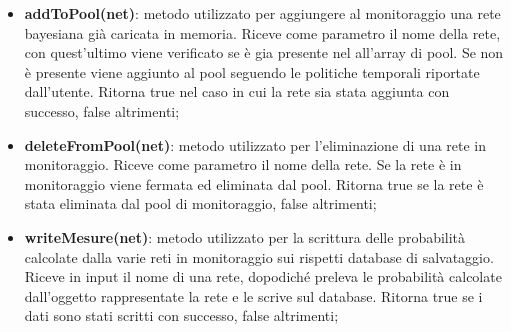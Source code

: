 \begin{itemize}
	\item \textbf{addToPool(net)}: metodo utilizzato per aggiungere al monitoraggio una rete bayesiana già 
	caricata in memoria. Riceve come parametro il nome della rete, con quest'ultimo viene verificato 
	se è gia presente nel all'array di pool. Se non è presente viene aggiunto al pool seguendo le politiche 
	temporali riportate dall'utente. Ritorna true nel caso in cui la rete sia stata aggiunta con successo, false 
	altrimenti; 

	\item \textbf{deleteFromPool(net)}: metodo utilizzato per l'eliminazione di una rete in monitoraggio. Riceve
	come parametro il nome della rete. Se la rete è in monitoraggio viene fermata ed eliminata dal pool.
	Ritorna true se la rete è stata eliminata dal pool di monitoraggio, false altrimenti; 
	
	\item \textbf{writeMesure(net)}: metodo utilizzato per la scrittura delle probabilità calcolate dalla
	varie reti in monitoraggio sui rispetti database di salvataggio. Riceve in input il nome di una rete, 
	dopodiché preleva le probabilità calcolate dall'oggetto rappresentate la rete e le scrive sul database. 
	Ritorna true se i dati sono stati scritti con successo, false altrimenti; 
	
\end{itemize}

